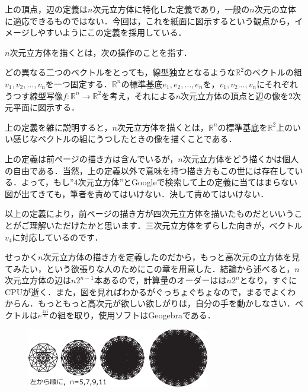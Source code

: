 \documentclass[./main]{subfiles} %
\begin{document}
\rem
上の頂点，辺の定義は$n$次元立方体に特化した定義であり，一般の$n$次元の立体に適応できるものではない．今回は，これを紙面に図示するという観点から，イメージしやすいようにこの定義を採用している．

\maskdefi [$n$次元立方体を描く]

$n$次元立方体を描くとは，次の操作のことを指す．

どの異なる二つのベクトルをとっても，線型独立となるような$\mathbb{R}^2$のベクトルの組$v_1, v_2 , \ldots , v_n$を一つ固定する．$\mathbb{R}^n$の標準基底$e_1 , e_2 , \ldots , e_n$を，$v_1,v_2 \ldots ,v_n$にそれぞれうつす線型写像$f \colon \mathbb{R}^n \rightarrow \mathbb{R}^2$を考え，それによる$n$次元立方体の頂点と辺の像を$2$次元平面に図示する．

\rem
上の定義を雑に説明すると，$n$次元立方体を描くとは，$\mathbb{R}^n$の標準基底を$\mathbb{R}^2$上のいい感じなベクトルの組にうつしたときの像を描くことである．

\rem

上の定義は前ページの描き方は含んでいるが，$n$次元立方体をどう描くかは個人の自由である．当然，上の定義以外で意味を持つ描き方もこの世には存在している．よって，もし''$4$次元立方体''とGoogleで検索して上の定義に当てはまらない図が出てきても，筆者を責めてはいけない．決して責めてはいけない．

以上の定義により，前ページの描き方が四次元立方体を描いたものだといいうことがご理解いただけたかと思います．三次元立方体をずらした向きが，ベクトル$v_4$に対応しているのです．

せっかく$n$次元立方体の描き方を定義したのだから，もっと高次元の立方体を見てみたい，という欲張りな人のためにこの章を用意した．結論から述べると，$n$次元立方体の辺は$n2^{n-1}$本あるので，計算量のオーダーはは$n2^n$となり，すぐに{\rm CPU}が逝く．また，図を見ればわかるがぐっちょぐちょなので，まるでよくわからん．もっともっと高次元が欲しい欲しがりは，自分の手を動かしなさい．ベクトルは$e^{\frac{2\pi i}{n}}$の組を取り，使用ソフトは{\rm Geogebra}である．

\begin{figure}[h]
\begin{center}
\includegraphics[width=80mm]{mask_rittai4.eps}
\end{center}
\end{figure}
\end{document}
